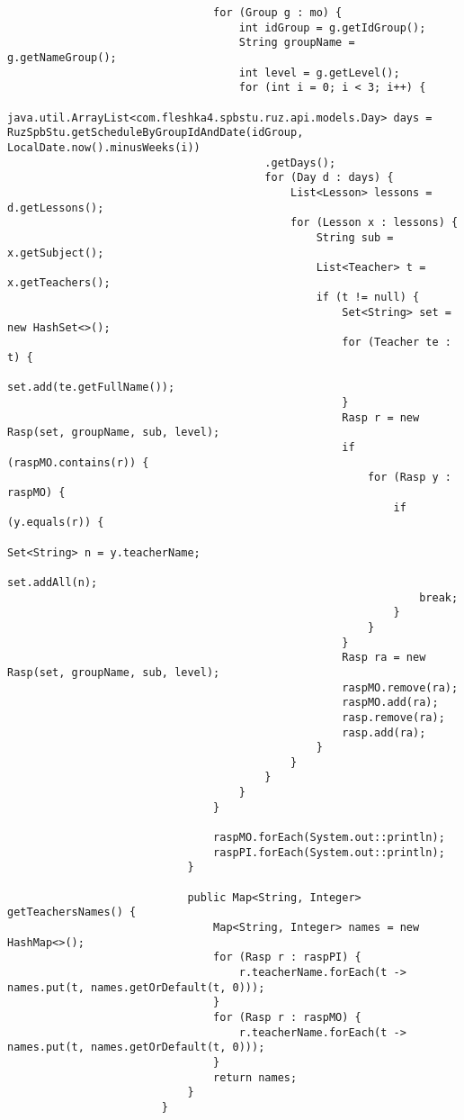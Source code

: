\begin{lstlisting}
								for (Group g : mo) {
									int idGroup = g.getIdGroup();
									String groupName = g.getNameGroup();
									int level = g.getLevel();
									for (int i = 0; i < 3; i++) {
										java.util.ArrayList<com.fleshka4.spbstu.ruz.api.models.Day> days = RuzSpbStu.getScheduleByGroupIdAndDate(idGroup, LocalDate.now().minusWeeks(i))
										.getDays();
										for (Day d : days) {
											List<Lesson> lessons = d.getLessons();
											for (Lesson x : lessons) {
												String sub = x.getSubject();
												List<Teacher> t = x.getTeachers();
												if (t != null) {
													Set<String> set = new HashSet<>();
													for (Teacher te : t) {
														set.add(te.getFullName());
													}
													Rasp r = new Rasp(set, groupName, sub, level);
													if (raspMO.contains(r)) {
														for (Rasp y : raspMO) {
															if (y.equals(r)) {
																Set<String> n = y.teacherName;
																set.addAll(n);
																break;
															}
														}
													}
													Rasp ra = new Rasp(set, groupName, sub, level);
													raspMO.remove(ra);
													raspMO.add(ra);
													rasp.remove(ra);
													rasp.add(ra);
												}
											}
										}
									}
								}
								
								raspMO.forEach(System.out::println);
								raspPI.forEach(System.out::println);
							}
							
							public Map<String, Integer> getTeachersNames() {
								Map<String, Integer> names = new HashMap<>();
								for (Rasp r : raspPI) {
									r.teacherName.forEach(t -> names.put(t, names.getOrDefault(t, 0)));
								}
								for (Rasp r : raspMO) {
									r.teacherName.forEach(t -> names.put(t, names.getOrDefault(t, 0)));
								}
								return names;
							}
						}
\end{lstlisting}		